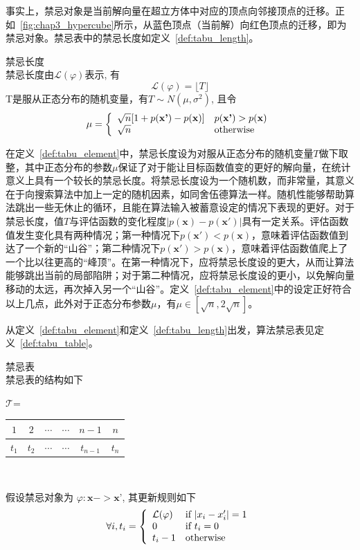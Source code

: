 事实上，禁忌对象是当前解向量在超立方体中对应的顶点向邻接顶点的迁移。正如\figurename~\ref{fig:chap3_hypercube}所示，从蓝色顶点（当前解）向红色顶点的迁移，即为禁忌对象。禁忌表中的禁忌长度如定义~\ref{def:tabu_length}。

\begin{definition}禁忌长度\\
禁忌长度由$\mathcal{L}(\varphi)$表示, 有
\[
\mathcal{L}(\varphi)=\lfloor T\rfloor
\]
T是服从正态分布的随机变量，有$T\sim N(\mu,\sigma^2)$, 且令
\[
\mu=\left\{
\begin{array}{ll}
\sqrt{n}[1+p(\textbf{x'})-p(\textbf{x})] & p(\textbf{x'})>p(\textbf{x}) \\
\sqrt{n} & \textnormal{otherwise}
\end{array}
\right.
\]
\label{def:tabu_length}
\end{definition}

在定义~\ref{def:tabu_element}中，禁忌长度设为对服从正态分布的随机变量$T$做下取整，其中正态分布的参数$\mu$保证了对于能让目标函数值变的更好的解向量，在统计意义上具有一个较长的禁忌长度。将禁忌长度设为一个随机数，而非常量，其意义在于向搜索算法中加上一定的随机因素，如同舍伍德算法一样。随机性能够帮助算法跳出一些无休止的循环，且能在算法输入被蓄意设定的情况下表现的更好。对于禁忌长度，值$T$与评估函数的变化程度$|p(\bm{x})-p(\bm{x'})|$具有一定关系。评估函数值发生变化具有两种情况；第一种情况下$p(\bm{x'})<p(\bm{x})$，意味着评估函数值到达了一个新的“山谷”；第二种情况下$p(\bm{x'})>p(\bm{x})$，意味着评估函数值爬上了一个比以往更高的“峰顶”。在第一种情况下，应将禁忌长度设的更大，从而让算法能够跳出当前的局部陷阱；对于第二种情况，应将禁忌长度设的更小，以免解向量移动的太远，再次掉入另一个“山谷”。定义~\ref{def:tabu_element}中的设定正好符合以上几点，此外对于正态分布参数$\mu$，有$\mu\in[\sqrt{n},2\sqrt{n}]$。

从定义~\ref{def:tabu_element}和定义~\ref{def:tabu_length}出发，算法禁忌表见定义~\ref{def:tabu_table}。

\begin{definition}禁忌表\\
禁忌表的结构如下 \\
\begin{center}
$\mathcal{T}$=
  \begin{tabular}{|c|c|cc|c|c|}
  \hline
   $1$ & $2$ & $\cdots$ & $\cdots$ & $n-1$ & $n$\\
   \hline
   $t_1$ & $t_2$ & $\cdots$ & $\cdots$ & $t_{n-1}$ & $t_n$ \\
    \hline
  \end{tabular} \\
\end{center}
假设禁忌对象为 $\varphi:\textbf{x}->\textbf{x'}$, 其更新规则如下
\[
\forall i, t_i=\left\{
\begin{array}{ll}
\mathcal{L}(\varphi) & \textnormal{if $|x_i-x'_i|=1$} \\
  0 & \textnormal{if}~t_i=0 \\
t_i-1 &  \textnormal{otherwise} \\
\end{array}
\right.
\]
\label{def:tabu_table}
\end{definition}

